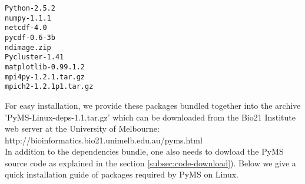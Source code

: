 \begin{verbatim}
Python-2.5.2
numpy-1.1.1
netcdf-4.0
pycdf-0.6-3b
ndimage.zip
Pycluster-1.41
matplotlib-0.99.1.2
mpi4py-1.2.1.tar.gz
mpich2-1.2.1p1.tar.gz
\end{verbatim}

For easy installation, we provide these packages bundled together into
the archive 'PyMS-Linux-deps-1.1.tar.gz' which can be downloaded from
the Bio21 Institute web server at the University of Melbourne:\\
http://bioinformatics.bio21.unimelb.edu.au/pyms.html\\

In addition to the dependencies bundle, one also needs to dowload the
PyMS source code as explained in the section \ref{subsec:code-download}).
Below we give a quick installation guide of packages required by PyMS
on Linux.

